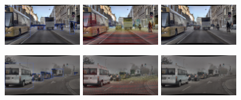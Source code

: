 \documentclass[report.tex]{subfiles}
\begin{document}

        \begin{figure}[ht!]
            \centering
            \includegraphics[width=0.3\textwidth]{images/datasets/dense/samples/day/2018-02-05_12-07-39_00300.png}\hfill
            \includegraphics[width=0.3\textwidth]{images/datasets/dense/samples/day/clean_lidar.png}\hfill
            \includegraphics[width=0.3\textwidth]{images/datasets/dense/samples/day/clean_radar.png}
          
            \includegraphics[width=0.3\textwidth]{images/datasets/dense/samples/light_fog/2018-10-08_08-10-40_02160.png}\hfill
            \includegraphics[width=0.3\textwidth]{images/datasets/dense/samples/light_fog/light_fog_lidar.png}\hfill
            \includegraphics[width=0.3\textwidth]{images/datasets/dense/samples/light_fog/light_fog_radar.png}
          

\end{figure}
\end{document}
